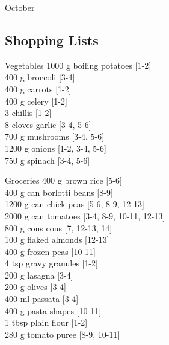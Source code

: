 \begin{menu}{October}
    \subsection*{Shopping Lists}
      \begin{shoppinglist}{Vegetables}
      1000 g boiling potatoes {\scriptsize[1-2]}\\
      400 g broccoli {\scriptsize[3-4]}\\
      400 g carrots {\scriptsize[1-2]}\\
      400 g celery {\scriptsize[1-2]}\\
      3  chillis {\scriptsize[1-2]}\\
      8 cloves garlic {\scriptsize[3-4, 5-6]}\\
      700 g mushrooms {\scriptsize[3-4, 5-6]}\\
      1200 g onions {\scriptsize[1-2, 3-4, 5-6]}\\
      750 g spinach {\scriptsize[3-4, 5-6]}\\
      \end{shoppinglist}%
      \begin{shoppinglist}{Groceries}
      400 g brown rice {\scriptsize[5-6]}\\
      400 g can borlotti beans {\scriptsize[8-9]}\\
      1200 g can chick peas {\scriptsize[5-6, 8-9, 12-13]}\\
      2000 g can tomatoes {\scriptsize[3-4, 8-9, 10-11, 12-13]}\\
      800 g cous cous {\scriptsize[7, 12-13, 14]}\\
      100 g flaked almonds {\scriptsize[12-13]}\\
      400 g frozen peas {\scriptsize[10-11]}\\
      4 tsp gravy granules {\scriptsize[1-2]}\\
      200 g lasagna {\scriptsize[3-4]}\\
      200 g olives {\scriptsize[3-4]}\\
      400 ml passata {\scriptsize[3-4]}\\
      400 g pasta shapes {\scriptsize[10-11]}\\
      1 tbsp plain flour {\scriptsize[1-2]}\\
      280 g tomato puree {\scriptsize[8-9, 10-11]}\\
      \end{shoppinglist}%
      \par\vfil %

\end{menu}
